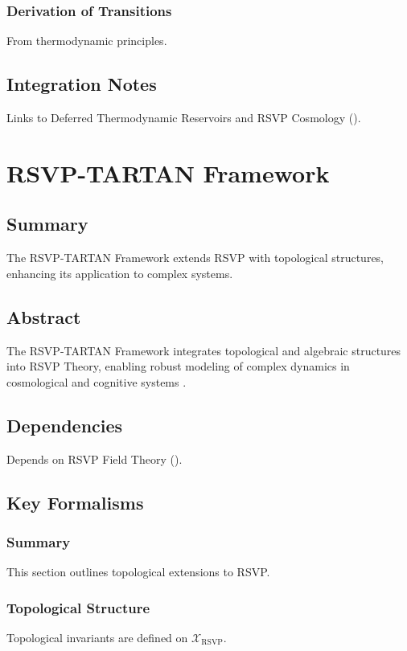 \documentclass[11pt,oneside]{memoir}
\theoremstyle{plain}
\newcommand{\X}{\mathcal{X}}
\begin{document}
\subsection{Derivation of Transitions}
From thermodynamic principles.

\section{Integration Notes}
Links to Deferred Thermodynamic Reservoirs and RSVP Cosmology ().

\chapter{RSVP-TARTAN Framework}
\label{sec:rsvp_tartan}

\section{Summary}
The RSVP-TARTAN Framework extends RSVP with topological structures, enhancing its application to complex systems.

\section{Abstract}
The RSVP-TARTAN Framework integrates topological and algebraic structures into RSVP Theory, enabling robust modeling of complex dynamics in cosmological and cognitive systems \cite{lurie}.

\section{Dependencies}
Depends on RSVP Field Theory ().

\section{Key Formalisms}
\subsection{Summary}
This section outlines topological extensions to RSVP.

\subsection{Topological Structure}
Topological invariants are defined on \(\X_{\mathrm{RSVP}}\).
\end{document}
